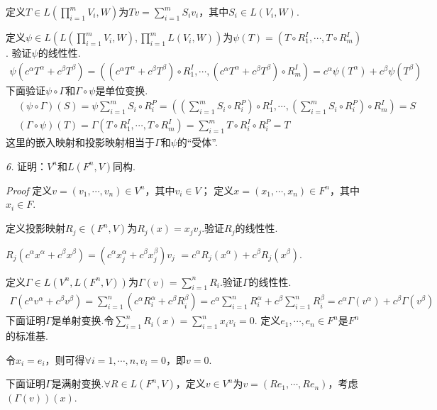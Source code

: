 定义\(T \in L(\prod_{i=1}^m V_i,W)\)为\(Tv=\sum_{i=1}^m S_iv_i\)，其中\(S_i \in L(V_i,W)\).

定义\(\psi \in L(L(\prod_{i=1}^m V_i,W),\prod_{i=1}^m L(V_i,W))\)为\(\psi(T)=(T \circ R_1^I,\cdots,T \circ R_m^I)\).
验证\(\psi\)的线性性.
    \begin{align*}
        \psi(c^\alpha T^\alpha+c^\beta T^\beta)
        =((c^\alpha T^\alpha+c^\beta T^\beta) \circ R_1^I,\cdots,(c^\alpha T^\alpha+c^\beta T^\beta) \circ R_m^I)
        =c^\alpha \psi(T^\alpha)+c^\beta \psi(T^\beta)
    \end{align*}
下面验证\(\psi \circ \Gamma\)和\(\Gamma \circ \psi\)是单位变换.
    \begin{align*}
        &(\psi \circ \Gamma)(S)=\psi \sum_{i=1}^m S_i \circ R_i^P
        =((\sum_{i=1}^m S_i \circ R_i^P) \circ R_1^I,\cdots,(\sum_{i=1}^m S_i \circ R_i^P) \circ R_m^I)=S \\
        &(\Gamma \circ \psi)(T)=\Gamma(T \circ R_1^I,\cdots,T \circ R_m^I)
        =\sum_{i=1}^m T \circ R_i^I \circ R_i^P=T
    \end{align*}
这里的嵌入映射和投影映射相当于\(\Gamma\)和\(\psi\)的“受体”.

\newpage

\textit{6.}
证明：\(V^n\)和\(L(F^n,V)\)同构.

\textit{Proof}
定义\(v=(v_1,\cdots,v_n) \in V^n\)，其中\(v_i \in V\)；
定义\(x=(x_1,\cdots,x_n) \in F^n\)，其中\(x_i \in F\).

定义投影映射\(R_j \in (F^n,V)\)为\(R_j(x)=x_jv_j\).验证\(R_j\)的线性性.

\(R_j(c^\alpha x^\alpha+c^\beta x^\beta)=(c^\alpha x_j^\alpha+c^\beta x_j^\beta)v_j\)
\(=c^\alpha R_j(x^\alpha)+c^\beta R_j(x^\beta)\).

定义\(\Gamma \in L(V^n,L(F^n,V))\)为\(\Gamma(v)=\sum_{i=1}^n R_i\).验证\(\Gamma\)的线性性.
    \begin{align*}
        \Gamma(c^\alpha v^\alpha+c^\beta v^\beta)
        =\sum_{i=1}^n (c^\alpha R_i^\alpha+c^\beta R_i^\beta)
        =c^\alpha \sum_{i=1}^n R_i^\alpha+c^\beta \sum_{i=1}^n R_i^\beta
        =c^\alpha \Gamma(v^\alpha)+c^\beta \Gamma(v^\beta)
    \end{align*}
下面证明\(\Gamma\)是单射变换.令\(\sum_{i=1}^n R_i(x)=\sum_{i=1}^n x_iv_i=0\).
定义\(e_1,\cdots,e_n \in F^n\)是\(F^n\)的标准基.

令\(x_i=e_i\)，则可得\(\forall i=1,\cdots,n,v_i=0\)，即\(v=0\).

下面证明\(\Gamma\)是满射变换.\(\forall R \in L(F^n,V)\)，定义\(v \in V^n\)为\(v=(Re_1,\cdots,Re_n)\)，考虑\((\Gamma(v))(x)\).

